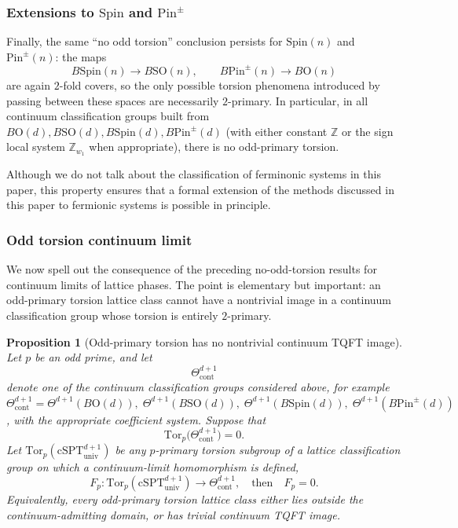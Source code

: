 \documentclass[aps,prx,reprint,superscriptaddress,twocolumn,amsmath,amssymb,amsfonts, nofootinbib]{revtex4-2}
\newcommand{\SO}{\text{SO}}
\newcommand{\tor}{\text{Tor}}
\newcommand{\Z}{\mathbb{Z}}
\theoremstyle{apsstyle}
\newtheorem{proposition}[theorem]{Proposition}
\begin{document}
\subsubsection{Extensions to $\mathrm{Spin}$ and $\mathrm{Pin}^{\pm}$}

Finally, the same ``no odd torsion'' conclusion persists for $\mathrm{Spin}(n)$ and $\mathrm{Pin}^{\pm}(n)$:
the maps
\[
B\mathrm{Spin}(n)\to B\SO(n),\qquad B\mathrm{Pin}^{\pm}(n)\to B\mathrm{O}(n)
\]
are again $2$-fold covers, so the only possible torsion phenomena introduced by passing between these spaces are necessarily $2$-primary. In particular, in all continuum classification groups built from $B\mathrm{O}(d),B\SO(d),B\mathrm{Spin}(d),B\mathrm{Pin}^{\pm}(d)$ (with either constant $\Z$ or the sign local system $\Z_{w_1}$ when appropriate), there is no odd-primary torsion.

\bigskip 

Although we do not talk about the classification of ferminonic systems in this paper, this property ensures that a formal extension of the methods discussed in this paper to fermionic systems is possible in principle. 


\subsubsection{Odd torsion continuum limit}
\label{app:odd_torsion_continuum_limit}

We now spell out the consequence of the preceding no-odd-torsion results for continuum limits of lattice phases. The point is elementary but important: an odd-primary torsion lattice class cannot have a nontrivial image in a continuum classification group whose torsion is entirely $2$-primary.

\bigskip 

\begin{proposition}[Odd-primary torsion has no nontrivial continuum TQFT image]
\label{prop:odd_torsion_collapse}
Let $p$ be an odd prime, and let
\begin{equation}
\Theta^{d+1}_{\mathrm{cont}}
\end{equation}
denote one of the continuum classification groups considered above, for example $
\Theta^{d+1}_{\mathrm{cont}}
=
\Theta^{d+1}(B\mathrm{O}(d)),\;
\Theta^{d+1}(B\SO(d)),\;
\Theta^{d+1}(B\mathrm{Spin}(d)),\;
\Theta^{d+1}(B\mathrm{Pin}^{\pm}(d))$, with the appropriate coefficient system. Suppose that
\begin{equation}
\tor_p\bigl(\Theta^{d+1}_{\mathrm{cont}}\bigr)=0.
\end{equation}
Let $\tor_{p}(\mathrm{cSPT}^{d+1}_{\mathrm{univ}})$ be any $p$-primary torsion subgroup of a lattice classification group on which a continuum-limit homomorphism is defined,
\begin{equation}
F_p:\tor_{p}(\mathrm{cSPT}^{d+1}_{\mathrm{univ}})\longrightarrow \Theta^{d+1}_{\mathrm{cont}},\quad 
\text{then}\quad 
F_p=0.
\end{equation}
Equivalently, every odd-primary torsion lattice class either lies outside the continuum-admitting domain, or has trivial continuum TQFT image.
\end{proposition}
\end{document}
